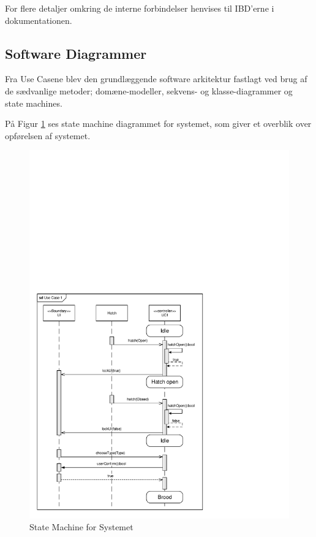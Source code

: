 For flere detaljer omkring de interne forbindelser henvises til IBD'erne i dokumentationen.
\clearpage
\subsection{Software Diagrammer}

Fra Use Casene blev den grundlæggende software arkitektur fastlagt ved brug af de sædvanlige metoder; domæne-modeller, sekvens- og klasse-diagrammer og state machines. 

På Figur \ref{fig:StateMachine} ses state machine diagrammet for systemet, som giver et overblik over opførelsen af systemet. 

\begin{figure}[H]
\centering
\includegraphics[page=3,scale=0.85,trim=5mm 5mm 230mm 190mm]{./7_projektbeskrivelse/systemarkitektur/diagrammer/ArkitekturDiagrammer.pdf}
\caption[Diagram]{State Machine for Systemet}
\label{fig:StateMachine}
\end{figure}

